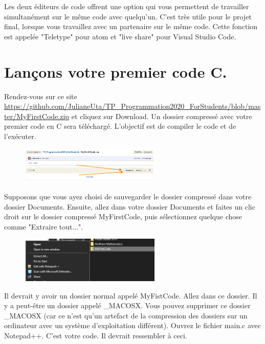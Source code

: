 \documentclass{article}
\begin{document}
Les deux éditeurs de code offrent une option qui vous permettent de travailler simultanément sur le même code avec quelqu'un. C'est très utile pour le projet final, lorsque vous travaillez avec un partenaire sur le même code. Cette fonction est appelée "Teletype" pour atom et "live share" pour Visual Studio Code.

\section{Lançons votre premier code C.}
Rendez-vous sur ce site \href{https://github.com/JulianeUta/TP_Programmation2020_ForStudents/blob/master/MyFirstCode.zip}{https://github.com/JulianeUta/TP\_Programmation2020\_ForStudents/blob/master/MyFirstCode.zip} et cliquez sur Download. Un dossier compressé avec votre premier code en C sera téléchargé. L'objectif est de compiler le code et de l'exécuter.
\begin{figure}[H]
\center
\includegraphics[width=0.6\textwidth]{Plots/FirstCode_1.png}
\end{figure}
Supposons que vous ayez choisi de sauvegarder le dossier compressé dans votre dossier Documents. Ensuite, allez dans votre dossier Documents et faites un clic droit sur le dossier compressé MyFirstCode, puis sélectionnez quelque chose comme "Extraire tout...".
\begin{figure}[H]
\center
\includegraphics[width=0.6\textwidth]{Plots/FirstCode_2.jpg}
\end{figure}
Il devrait y avoir un dossier normal appelé MyFistCode. Allez dans ce dossier. Il y a peut-être un dossier appelé \_MACOSX.  Vous pouvez supprimer ce dossier \_MACOSX (car ce n'est qu'un artefact de la compression des dossiers sur un ordinateur avec un système d'exploitation différent). Ouvrez le fichier main.c avec Notepad++. C'est votre code. Il devrait ressembler à ceci. 
\end{document}
